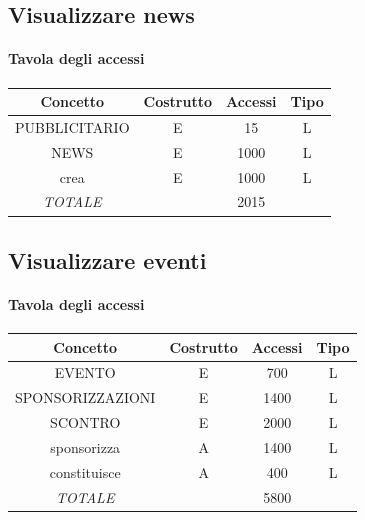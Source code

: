 \documentclass[a4paper,12pt]{report}
\begin{document}
\subsection{Visualizzare news}
\begin{table}[H]
    \paragraph{Tavola degli accessi\newline}
    \begin{tabular}{|c|c|c|c|}
    \hline
    Concetto          & Costrutto & Accessi & Tipo \\ \hline
    PUBBLICITARIO     & E         & 15      & L    \\ \hline
    NEWS              & E         & 1000    & L    \\ \hline
    crea              & E         & 1000    & L    \\ \hline
    \textit{TOTALE}   &           & 2015    &      \\ \hline
    \end{tabular}
\end{table}

\subsection{Visualizzare eventi}
\begin{table}[H]
    \paragraph{Tavola degli accessi\newline}
    \begin{tabular}{|c|c|c|c|}
    \hline
    Concetto                    & Costrutto & Accessi & Tipo \\ \hline
    EVENTO                      & E         & 700     & L    \\ \hline
    SPONSORIZZAZIONI            & E         & 1400    & L    \\ \hline
    SCONTRO                     & E         & 2000    & L    \\ \hline
    sponsorizza                 & A         & 1400    & L    \\ \hline
    constituisce                & A         & 400     & L    \\ \hline
    \textit{TOTALE}             &           & 5800    &      \\ \hline
    \end{tabular}
\end{table}
\end{document}
